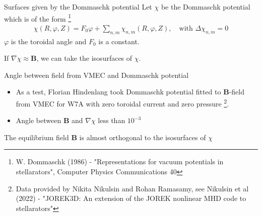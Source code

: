 \documentclass[
	english,%
	logo=false,%
	eurofusion=false, %
	titlegraphic=true, %
	]{ippbeamer}
\begin{document}
\begin{frame}{Surfaces given by the Dommaschk potential}
	Let $\chi$ be the Dommaschk potential which is of the form
	\footnote{W. Dommaschk (1986) - "Representations for vacuum potentials in stellarators", 
				Computer Physics Communications 40}
	\begin{align*}
		\chi (R,\varphi, Z) = F_0 \varphi + \sum_{n,m} \chi_{n,m}(R, \varphi, Z), 
			\quad \text{with }\Delta \chi_{n,m} = 0
	\end{align*}
	$\varphi$ is the toroidal angle and 
	$F_0$ is a constant. 

	\begin{alertblock}{}
		If $\nabla \chi \approx \mathbf{B}$, 
		we can take the isosurfaces of $\chi$. 	
	\end{alertblock}

\end{frame}
	
\begin{frame}{Angle between field from VMEC and Dommaschk potential}
	\begin{itemize}
		\item As a test, Florian Hindenlang took Dommaschk potential fitted to $\mathbf{B}$-field from VMEC for W7A 
			with zero toroidal current and zero pressure
			\footnote{Data provided by Nikita Nikulsin and Rohan Ramasamy, see Nikulsin et al (2022) - 
			"JOREK3D: An extension of the JOREK nonlinear MHD code 
			to stellarators"}.
		\item Angle between $\mathbf{B}$ and $\nabla \chi$ less than $10^{-3}$
	\end{itemize}

	\begin{alertblock}{}
		The equilibrium field $\mathbf{B}$ is almost orthogonal to the isosurfaces of $\chi$
	\end{alertblock}




\end{frame}
\end{document}

